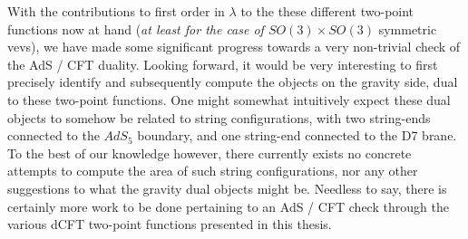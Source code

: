 With the contributions to first order in $\lambda$ to the these different two-point functions now at hand (\textit{at least for the case of $SO(3) \times SO(3)$} symmetric vevs), we have made some significant progress towards a very non-trivial check of the AdS / CFT duality. Looking forward, it would be very interesting to first precisely identify and subsequently compute the objects on the gravity side, dual to these two-point functions. One might somewhat intuitively expect these dual objects to somehow be related to string configurations, with two string-ends connected to the $AdS_5$ boundary, and one string-end connected to the D7 brane. To the best of our knowledge however, there currently exists no concrete attempts to compute the area of such string configurations, nor any other suggestions to what the gravity dual objects might be. Needless to say, there is certainly more work to be done pertaining to an AdS / CFT check through the various dCFT two-point functions presented in this thesis.


%
%
%
\label{end of main body}